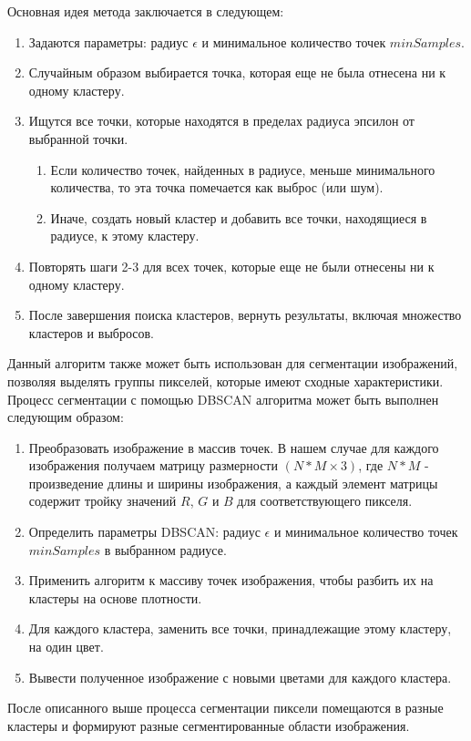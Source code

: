 \documentclass{article}
\begin{document}
Основная идея метода заключается в следующем:
\begin{enumerate}
\item Задаются параметры: радиус $\epsilon$ и минимальное количество точек $minSamples$.
\item Случайным образом выбирается точка, которая еще не была отнесена ни к одному кластеру.
\item Ищутся все точки, которые находятся в пределах радиуса эпсилон от выбранной точки.
\begin{enumerate}
\item Если количество точек, найденных в радиусе, меньше минимального количества, то эта точка помечается как выброс (или шум).
\item Иначе, создать новый кластер и добавить все точки, находящиеся в радиусе, к этому кластеру.
\end{enumerate}
\item Повторять шаги 2-3 для всех точек, которые еще не были отнесены ни к одному кластеру. 
\item После завершения поиска кластеров, вернуть результаты, включая множество кластеров и выбросов.
\end{enumerate}

Данный алгоритм также может быть использован для сегментации изображений, позволяя выделять группы пикселей, которые имеют сходные характеристики. Процесс сегментации с помощью DBSCAN алгоритма может быть выполнен следующим образом:
\begin{enumerate}
\item Преобразовать изображение в массив точек. В нашем случае для каждого изображения получаем матрицу размерности $(N*M \times 3)$, где $N*M$ - произведение длины и ширины изображения, а каждый элемент матрицы содержит тройку значений $R$, $G$ и $B$ для соответствующего пикселя.

\item Определить параметры DBSCAN: радиус $\epsilon$ и минимальное количество точек $minSamples$ в выбранном радиусе.
\item Применить алгоритм к массиву точек изображения, чтобы разбить их на кластеры на основе плотности.
\item Для каждого кластера, заменить все точки, принадлежащие этому кластеру, на один цвет.
\item Вывести полученное изображение с новыми цветами для каждого кластера.
\end{enumerate}

После описанного выше процесса сегментации пиксели помещаются в разные кластеры и формируют разные сегментированные области изображения.
\end{document}
